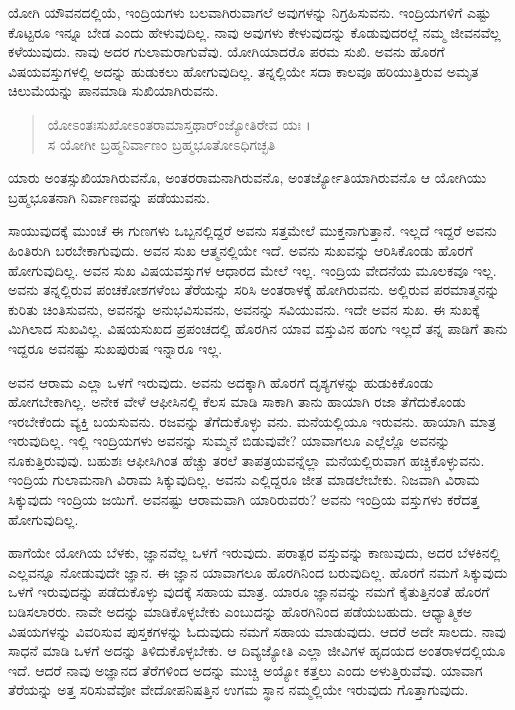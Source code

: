 ಯೋಗಿ ಯೌವನದಲ್ಲಿಯೆ, ಇಂದ್ರಿಯಗಳು ಬಲವಾಗಿರುವಾಗಲೆ ಅವುಗಳನ್ನು ನಿಗ್ರಹಿಸುವನು. ಇಂದ್ರಿಯಗಳಿಗೆ ಎಷ್ಟು ಕೊಟ್ಟರೂ ಇನ್ನೂ ಬೇಡ ಎಂದು ಹೇಳುವುದಿಲ್ಲ. ನಾವು ಅವುಗಳು ಕೇಳುವುದನ್ನು ಕೊಡುವುದರಲ್ಲೆ ನಮ್ಮ ಜೀವನವೆಲ್ಲ ಕಳೆಯುವುದು. ನಾವು ಅದರ ಗುಲಾಮರಾಗುವೆವು. ಯೋಗಿಯಾದರೊ ಪರಮ ಸುಖಿ. ಅವನು ಹೊರಗೆ ವಿಷಯವಸ್ತುಗಳಲ್ಲಿ ಅದನ್ನು ಹುಡುಕಲು ಹೋಗುವುದಿಲ್ಲ. ತನ್ನಲ್ಲಿಯೇ ಸದಾ ಕಾಲವೂ ಹರಿಯುತ್ತಿರುವ ಅಮೃತ ಚಿಲುಮೆಯನ್ನು ಪಾನಮಾಡಿ ಸುಖಿಯಾಗಿರುವನು.

\begin{verse}
ಯೋಽಂತಃಸುಖೋಽಂತರಾಮಾಸ್ತಥಾರ್ಂಜ್ಯೋತಿರೇವ ಯಃ ।\\ಸ ಯೋಗೀ ಬ್ರಹ್ಮನಿರ್ವಾಣಂ ಬ್ರಹ್ಮಭೂತೋಽಧಿಗಚ್ಛತಿ 
\end{verse}

{\small ಯಾರು ಅಂತಸ್ಸುಖಿಯಾಗಿರುವನೊ, ಅಂತರರಾಮನಾಗಿರುವನೊ, ಅಂತರ್ಜ್ಯೋತಿಯಾಗಿರುವನೊ ಆ ಯೋಗಿಯು ಬ್ರಹ್ಮಭೂತನಾಗಿ ನಿರ್ವಾಣವನ್ನು ಪಡೆಯುವನು.}

ಸಾಯುವುದಕ್ಕೆ ಮುಂಚೆ ಈ ಗುಣಗಳು ಒಬ್ಬನಲ್ಲಿದ್ದರೆ ಅವನು ಸತ್ತಮೇಲೆ ಮುಕ್ತನಾಗುತ್ತಾನೆ. ಇಲ್ಲದೆ ಇದ್ದರೆ ಅವನು ಹಿಂತಿರುಗಿ ಬರಬೇಕಾಗುವುದು. ಅವನ ಸುಖ ಆತ್ಮನಲ್ಲಿಯೇ ಇದೆ. ಅವನು ಸುಖವನ್ನು ಆರಿಸಿಕೊಂಡು ಹೊರಗೆ ಹೋಗುವುದಿಲ್ಲ. ಅವನ ಸುಖ ವಿಷಯವಸ್ತುಗಳ ಆಧಾರದ ಮೇಲೆ ಇಲ್ಲ. ಇಂದ್ರಿಯ ವೇದನೆಯ ಮೂಲಕವೂ ಇಲ್ಲ. ಅವನು ತನ್ನಲ್ಲಿರುವ ಪಂಚಕೋಶಗಳೆಂಬ ತೆರೆಯನ್ನು ಸರಿಸಿ ಅಂತರಾಳಕ್ಕೆ ಹೋಗಿರುವನು. ಅಲ್ಲಿರುವ ಪರಮಾತ್ಮನನ್ನು ಕುರಿತು ಚಿಂತಿಸುವನು, ಅವನನ್ನು ಅನುಭವಿಸುವನು, ಅವನನ್ನು ಸವಿಯುವನು. ಇದೇ ಅವನ ಸುಖ. ಈ ಸುಖಕ್ಕೆ ಮಿಗಿಲಾದ ಸುಖವಿಲ್ಲ. ವಿಷಯಸುಖದ ಪ್ರಪಂಚದಲ್ಲಿ ಹೊರಗಿನ ಯಾವ ವಸ್ತುವಿನ ಹಂಗು ಇಲ್ಲದೆ ತನ್ನ ಪಾಡಿಗೆ ತಾನು ಇದ್ದರೂ ಅವನಷ್ಟು ಸುಖಪುರುಷ ಇನ್ನಾರೂ ಇಲ್ಲ.

ಅವನ ಆರಾಮ ಎಲ್ಲಾ ಒಳಗೆ ಇರುವುದು. ಅವನು ಅದಕ್ಕಾಗಿ ಹೊರಗೆ ದೃಶ್ಯಗಳನ್ನು ಹುಡುಕಿಕೊಂಡು ಹೋಗಬೇಕಾಗಿಲ್ಲ. ಅನೇಕ ವೇಳೆ ಆಫೀಸಿನಲ್ಲಿ ಕೆಲಸ ಮಾಡಿ ಸಾಕಾಗಿ ತಾನು ಹಾಯಾಗಿ ರಜಾ ತೆಗೆದುಕೊಂಡು ಇರಬೇಕೆಂದು ವ್ಯಕ್ತಿ ಬಯಸುವನು. ರಜವನ್ನು ತೆಗೆದುಕೊಳ್ಳು ವನು. ಮನೆಯಲ್ಲಿಯೂ ಇರುವನು. ಹಾಯಾಗಿ ಮಾತ್ರ ಇರುವುದಿಲ್ಲ. ಇಲ್ಲಿ ಇಂದ್ರಿಯಗಳು ಅವನನ್ನು ಸುಮ್ಮನೆ ಬಿಡುವುವೇ? ಯಾವಾಗಲೂ ಎಲ್ಲೆಲ್ಲೊ ಅವನನ್ನು ನೂಕುತ್ತಿರುವುವು. ಬಹುಶಃ ಆಫೀಸಿಗಿಂತ ಹೆಚ್ಚು ತರಲೆ ತಾಪತ್ರಯವನ್ನೆಲ್ಲಾ ಮನೆಯಲ್ಲಿರುವಾಗ ಹಚ್ಚಿಕೊಳ್ಳುವನು. ಇಂದ್ರಿಯ ಗುಲಾಮನಾಗಿ ವಿರಾಮ ಸಿಕ್ಕುವುದಿಲ್ಲ. ಅವನು ಎಲ್ಲಿದ್ದರೂ ಜೀತ ಮಾಡಲೇಬೇಕು. ನಿಜವಾಗಿ ವಿರಾಮ ಸಿಕ್ಕುವುದು ಇಂದ್ರಿಯ ಜಯಿಗೆ. ಅವನಷ್ಟು ಆರಾಮವಾಗಿ ಯಾರಿರುವರು? ಅವನು ಇಂದ್ರಿಯ ವಸ್ತುಗಳು ಕರೆದತ್ತ ಹೋಗುವುದಿಲ್ಲ.

ಹಾಗೆಯೇ ಯೋಗಿಯ ಬೆಳಕು, ಜ್ಞಾನವೆಲ್ಲ ಒಳಗೆ ಇರುವುದು. ಪರಾತ್ಪರ ವಸ್ತುವನ್ನು ಕಾಣುವುದು, ಅದರ ಬೆಳಕಿನಲ್ಲಿ ಎಲ್ಲವನ್ನೂ ನೋಡುವುದೇ ಜ್ಞಾನ. ಈ ಜ್ಞಾನ ಯಾವಾಗಲೂ ಹೊರಗಿನಿಂದ ಬರುವುದಿಲ್ಲ. ಹೊರಗೆ ನಮಗೆ ಸಿಕ್ಕುವುದು ಒಳಗೆ ಇರುವುದನ್ನು ಪಡೆದುಕೊಳ್ಳು ವುದಕ್ಕೆ ಸಹಾಯ ಮಾತ್ರ. ಯಾರೂ ಜ್ಞಾನವನ್ನು ನಮಗೆ ಕೈತುತ್ತಿನಂತೆ ಹೊರಗೆ ಬಡಿಸಲಾರರು. ನಾವೇ ಅದನ್ನು ಮಾಡಿಕೊಳ್ಳಬೇಕು ಎಂಬುದನ್ನು ಹೊರಗಿನಿಂದ ಪಡೆಯಬಹುದು. ಆಧ್ಯಾತ್ಮಿಕಅ ವಿಷಯಗಳನ್ನು ವಿವರಿಸುವ ಪುಸ್ತಕಗಳನ್ನು ಓದುವುದು ನಮಗೆ ಸಹಾಯ ಮಾಡುವುದು. ಆದರೆ ಅದೇ ಸಾಲದು. ನಾವು ಸಾಧನೆ ಮಾಡಿ ಒಳಗೆ ಅದನ್ನು ತಿಳಿದುಕೊಳ್ಳಬೇಕು. ಆ ದಿವ್ಯಜ್ಯೋತಿ ಎಲ್ಲಾ ಜೀವಿಗಳ ಹೃದಯದ ಅಂತರಾಳದಲ್ಲಿಯೂ ಇದೆ. ಆದರೆ ನಾವು ಅಜ್ಞಾನದ ತೆರೆಗಳಿಂದ ಅದನ್ನು ಮುಚ್ಚಿ ಅಯ್ಯೋ ಕತ್ತಲು ಎಂದು ಅಳುತ್ತಿರುವೆವು. ಯಾವಾಗ ತೆರೆಯನ್ನು ಅತ್ತ ಸರಿಸುವೆವೋ ವೇದೋಪನಿಷತ್ತಿನ ಉಗಮ ಸ್ಥಾನ ನಮ್ಮಲ್ಲಿಯೇ ಇರುವುದು ಗೊತ್ತಾಗುವುದು.

